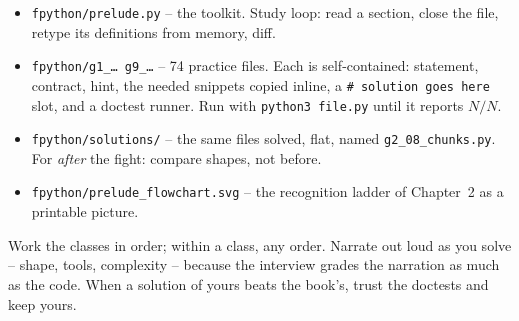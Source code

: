 \documentclass[11pt,letterpaper]{book}
\begin{document}
\begin{itemize}
\item \texttt{fpython/prelude.py} -- the toolkit. Study loop: read a section,
close the file, retype its definitions from memory, diff.
\item \texttt{fpython/g1\_\ldots{} g9\_\ldots} -- 74 practice files. Each is
self-contained: statement, contract, hint, the needed snippets copied inline,
a \texttt{\# solution goes here} slot, and a doctest runner. Run with
\texttt{python3 file.py} until it reports $N/N$.
\item \texttt{fpython/solutions/} -- the same files solved, flat, named
\texttt{g2\_08\_chunks.py}. For \emph{after} the fight: compare shapes, not
before.
\item \texttt{fpython/prelude\_flowchart.svg} -- the recognition ladder of
Chapter~2 as a printable picture.
\end{itemize}

Work the classes in order; within a class, any order. Narrate out loud as you
solve -- shape, tools, complexity -- because the interview grades the
narration as much as the code. When a solution of yours beats the book's,
trust the doctests and keep yours.
\backmatter
\end{document}
